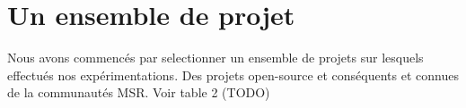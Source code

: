 \section{Un ensemble de projet}
\label{sec:ensemble_projet}
Nous avons commencés par selectionner un ensemble de projets sur lesquels effectués nos expérimentations. Des projets open-source et conséquents et connues de la communautés MSR. Voir table 2 (TODO)\\
